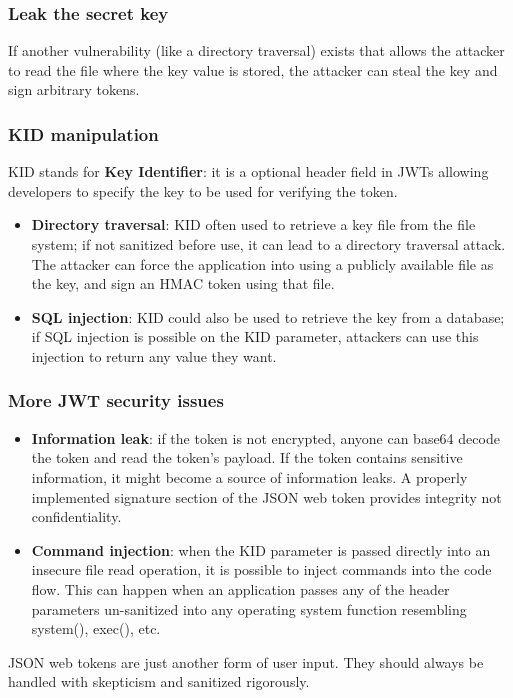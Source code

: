 \documentclass[a4paper, 10pt, titlepage]{article}
\begin{document}
\subsubsection*{Leak the secret key}
If another vulnerability (like a directory traversal) exists that allows the attacker to read the file where the key value is stored, the attacker can steal the key and sign arbitrary tokens.

\subsubsection*{KID manipulation}
KID stands for \textbf{Key Identifier}: it is a optional header field in JWTs allowing developers to specify the key to be used for verifying the token.
\begin{itemize}
\item \textbf{Directory traversal}: KID often used to retrieve a key file from the file system; if not sanitized before use, it can lead to a directory traversal attack. The attacker can force the application into using a publicly available file as the key, and sign an HMAC token using that file.
\item \textbf{SQL injection}: KID could also be used to retrieve the key from a database; if SQL injection is possible on the KID parameter, attackers can use this injection to return any value they want.
\end{itemize}

\subsubsection{More JWT security issues}
\begin{itemize}
\item \textbf{Information leak}: if the token is not encrypted, anyone can base64 decode the token and read the token’s payload. If the token contains sensitive information, it might become a source of information leaks. A properly implemented signature section of the JSON web token provides integrity not confidentiality.
\item \textbf{Command injection}: when the KID parameter is passed directly into an insecure file read operation, it is possible to inject commands into the code flow. This can happen when an application passes any of the header parameters un-sanitized into any operating system function resembling system(), exec(), etc.
\end{itemize}
JSON web tokens are just another form of user input. They should always be handled with skepticism and sanitized rigorously.
\end{document}
